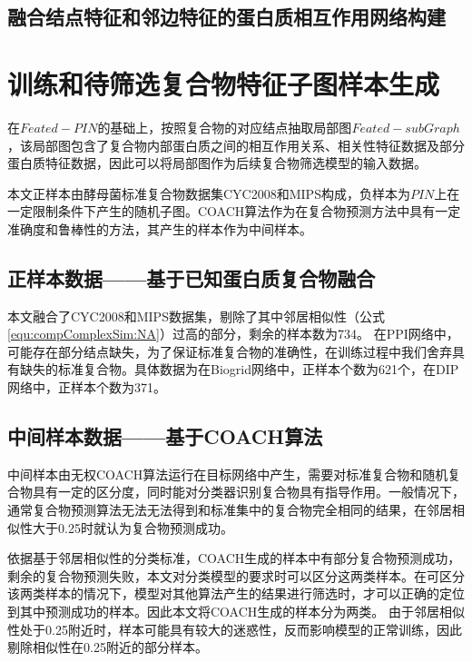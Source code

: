 \subsection{融合结点特征和邻边特征的蛋白质相互作用网络构建}
\label{subsection:featPPINetwork:addFeat}


\section{训练和待筛选复合物特征子图样本生成}
\label{section:featSubNetworkConstruct:allSample}

在$Feated-PIN$的基础上，按照复合物的对应结点抽取局部图$Feated-subGraph$，该局部图包含了复合物内部蛋白质之间的相互作用关系、相关性特征数据及部分蛋白质特征数据，因此可以将局部图作为后续复合物筛选模型的输入数据。

本文正样本由酵母菌标准复合物数据集CYC2008\cite{pu_up--date_2009}和MIPS\cite{pagel_mips_2005}构成，负样本为$PIN$上在一定限制条件下产生的随机子图。COACH算法\cite{leung_predicting_2009}作为在复合物预测方法中具有一定准确度和鲁棒性的方法，其产生的样本作为中间样本。


\subsection{正样本数据——基于已知蛋白质复合物融合}
\label{subsection:allSample:positiveSampleData}

本文融合了CYC2008和MIPS数据集，剔除了其中邻居相似性（公式\ref{equ:compComplexSim:NA}）过高的部分，剩余的样本数为734。
在PPI网络中，可能存在部分结点缺失，为了保证标准复合物的准确性，在训练过程中我们舍弃具有缺失的标准复合物。具体数据为在Biogrid网络中，正样本个数为621个，在DIP网络中，正样本个数为371。

\subsection{中间样本数据——基于COACH算法}
\label{subsection:allSample:middleSampleData}

中间样本由无权COACH算法运行在目标网络中产生，需要对标准复合物和随机复合物具有一定的区分度，同时能对分类器识别复合物具有指导作用。一般情况下，通常复合物预测算法无法无法得到和标准集中的复合物完全相同的结果，在邻居相似性大于0.25时就认为复合物预测成功。

依据基于邻居相似性的分类标准，COACH生成的样本中有部分复合物预测成功，剩余的复合物预测失败，本文对分类模型的要求时可以区分这两类样本。在可区分该两类样本的情况下，模型对其他算法产生的结果进行筛选时，才可以正确的定位到其中预测成功的样本。因此本文将COACH生成的样本分为两类。
由于邻居相似性处于0.25附近时，样本可能具有较大的迷惑性，反而影响模型的正常训练，因此剔除相似性在0.25附近的部分样本。

